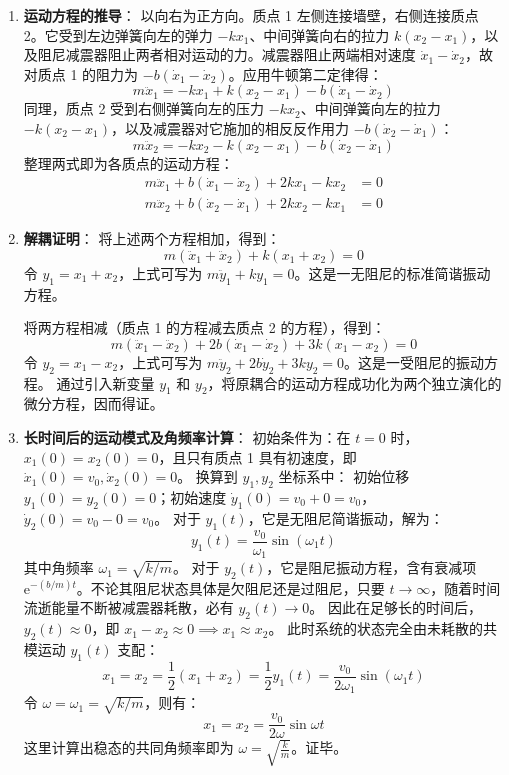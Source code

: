 \begin{solution}
\begin{enumerate}
    \item[(a)] \textbf{运动方程的推导}：
    以向右为正方向。质点 1 左侧连接墙壁，右侧连接质点 2。它受到左边弹簧向左的弹力 $-k x_1$、中间弹簧向右的拉力 $k(x_2 - x_1)$，以及阻尼减震器阻止两者相对运动的力。减震器阻止两端相对速度 $\dot{x}_1 - \dot{x}_2$，故对质点 1 的阻力为 $-b(\dot{x}_1 - \dot{x}_2)$。应用牛顿第二定律得：
    $$ m \ddot{x}_1 = -k x_1 + k(x_2 - x_1) - b(\dot{x}_1 - \dot{x}_2) $$
    同理，质点 2 受到右侧弹簧向左的压力 $-k x_2$、中间弹簧向左的拉力 $-k(x_2 - x_1)$，以及减震器对它施加的相反反作用力 $-b(\dot{x}_2 - \dot{x}_1)$：
    $$ m \ddot{x}_2 = -k x_2 - k(x_2 - x_1) - b(\dot{x}_2 - \dot{x}_1) $$
    整理两式即为各质点的运动方程：
    \begin{align*}
        m \ddot{x}_1 + b(\dot{x}_1 - \dot{x}_2) + 2k x_1 - k x_2 &= 0 \\
        m \ddot{x}_2 + b(\dot{x}_2 - \dot{x}_1) + 2k x_2 - k x_1 &= 0
    \end{align*}

    \item[(b)] \textbf{解耦证明}：
    将上述两个方程相加，得到：
    $$ m(\ddot{x}_1 + \ddot{x}_2) + k(x_1 + x_2) = 0 $$
    令 $y_1 = x_1 + x_2$，上式可写为 $m \ddot{y}_1 + k y_1 = 0$。这是一无阻尼的标准简谐振动方程。

    将两方程相减（质点 1 的方程减去质点 2 的方程），得到：
    $$ m(\ddot{x}_1 - \ddot{x}_2) + 2b(\dot{x}_1 - \dot{x}_2) + 3k(x_1 - x_2) = 0 $$
    令 $y_2 = x_1 - x_2$，上式可写为 $m \ddot{y}_2 + 2b \dot{y}_2 + 3k y_2 = 0$。这是一受阻尼的振动方程。
    通过引入新变量 $y_1$ 和 $y_2$，将原耦合的运动方程成功化为两个独立演化的微分方程，因而得证。

    \item[(c)] \textbf{长时间后的运动模式及角频率计算}：
    初始条件为：在 $t=0$ 时，$x_1(0) = x_2(0) = 0$，且只有质点 1 具有初速度，即 $\dot{x}_1(0) = v_0, \dot{x}_2(0) = 0$。
    换算到 $y_1, y_2$ 坐标系中：
    初始位移 $y_1(0) = y_2(0) = 0$；初始速度 $\dot{y}_1(0) = v_0 + 0 = v_0$，$\dot{y}_2(0) = v_0 - 0 = v_0$。
    对于 $y_1(t)$，它是无阻尼简谐振动，解为：
    $$ y_1(t) = \frac{v_0}{\omega_1} \sin(\omega_1 t) $$
    其中角频率 $\omega_1 = \sqrt{k/m}$。
    对于 $y_2(t)$，它是阻尼振动方程，含有衰减项 $\mathrm{e}^{-(b/m)t}$。不论其阻尼状态具体是欠阻尼还是过阻尼，只要 $t \to \infty$，随着时间流逝能量不断被减震器耗散，必有 $y_2(t) \to 0$。
    因此在足够长的时间后，$y_2(t) \approx 0$，即 $x_1 - x_2 \approx 0 \implies x_1 \approx x_2$。
    此时系统的状态完全由未耗散的共模运动 $y_1(t)$ 支配：
    $$ x_1 = x_2 = \frac{1}{2} (x_1 + x_2) = \frac{1}{2} y_1(t) = \frac{v_0}{2\omega_1} \sin(\omega_1 t) $$
    令 $\omega = \omega_1 = \sqrt{k/m}$，则有：
    $$ x_1 = x_2 = \frac{v_0}{2\omega} \sin \omega t $$
    这里计算出稳态的共同角频率即为 $\omega = \sqrt{\frac{k}{m}}$。证毕。
\end{enumerate}
\end{solution}

